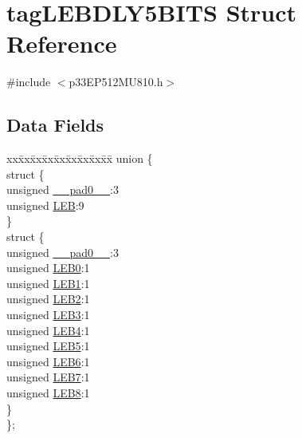 \hypertarget{structtag_l_e_b_d_l_y5_b_i_t_s}{}\section{tag\+L\+E\+B\+D\+L\+Y5\+B\+I\+TS Struct Reference}
\label{structtag_l_e_b_d_l_y5_b_i_t_s}


{\ttfamily \#include $<$p33\+E\+P512\+M\+U810.\+h$>$}

\subsection*{Data Fields}
\begin{DoxyCompactItemize}
\item 
\begin{tabbing}
xx\=xx\=xx\=xx\=xx\=xx\=xx\=xx\=xx\=\kill
union \{\\
\>struct \{\\
\>\>unsigned \hyperlink{structtag_l_e_b_d_l_y5_b_i_t_s_adf71f3d8410c1f1dbbc96680a92c49af}{\_\_pad0\_\_}:3\\
\>\>unsigned \hyperlink{structtag_l_e_b_d_l_y5_b_i_t_s_a850b96052b17c96a4012653317c39bdf}{LEB}:9\\
\>\} \\
\>struct \{\\
\>\>unsigned \hyperlink{structtag_l_e_b_d_l_y5_b_i_t_s_adf71f3d8410c1f1dbbc96680a92c49af}{\_\_pad0\_\_}:3\\
\>\>unsigned \hyperlink{structtag_l_e_b_d_l_y5_b_i_t_s_a1710dcadd784ef12033a5cf8121accb3}{LEB0}:1\\
\>\>unsigned \hyperlink{structtag_l_e_b_d_l_y5_b_i_t_s_ab0505c0f812822c77a65e8bfe2db4f40}{LEB1}:1\\
\>\>unsigned \hyperlink{structtag_l_e_b_d_l_y5_b_i_t_s_a120826056ccccfac30aa9e8a0569ae88}{LEB2}:1\\
\>\>unsigned \hyperlink{structtag_l_e_b_d_l_y5_b_i_t_s_a7b918c1b7306fd3ff86ab19bcb5365a4}{LEB3}:1\\
\>\>unsigned \hyperlink{structtag_l_e_b_d_l_y5_b_i_t_s_a5fbd877152dfc4182c4456b4224ec747}{LEB4}:1\\
\>\>unsigned \hyperlink{structtag_l_e_b_d_l_y5_b_i_t_s_a4371c46a68a319773f493c25667df943}{LEB5}:1\\
\>\>unsigned \hyperlink{structtag_l_e_b_d_l_y5_b_i_t_s_a2b8fccc4fb31a13c611cfb0d1c53aff0}{LEB6}:1\\
\>\>unsigned \hyperlink{structtag_l_e_b_d_l_y5_b_i_t_s_aa76d586b04119d8459718019ddd964ef}{LEB7}:1\\
\>\>unsigned \hyperlink{structtag_l_e_b_d_l_y5_b_i_t_s_a9b22b47001301c6ae00c3eea0f385091}{LEB8}:1\\
\>\} \\
\}; \\

\end{tabbing}\end{DoxyCompactItemize}


